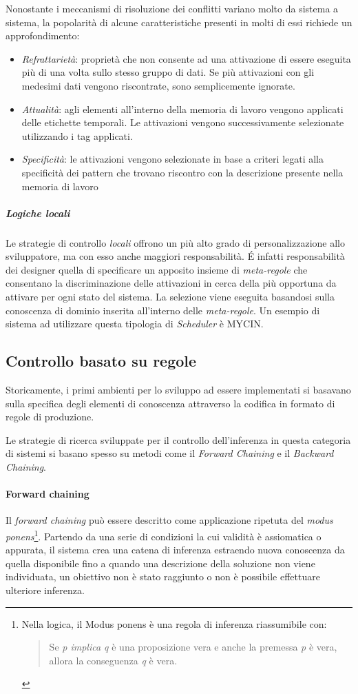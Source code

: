 Nonostante i meccanismi di risoluzione dei conflitti variano molto da sistema a sistema, la popolarità di alcune caratteristiche presenti in molti di essi richiede un approfondimento:

\begin{itemize}
	\item \emph{Refrattarietà}: proprietà che non consente ad una attivazione di essere eseguita più di una volta sullo stesso gruppo di dati. Se più attivazioni con gli medesimi dati vengono riscontrate, sono semplicemente ignorate.
	\item \emph{Attualità}: agli elementi all'interno della memoria di lavoro vengono applicati delle etichette temporali. Le attivazioni vengono successivamente selezionate utilizzando i tag applicati.
	\item \emph{Specificità}: le attivazioni vengono selezionate in base a criteri legati alla specificità dei pattern che trovano riscontro con la descrizione presente nella memoria di lavoro
\end{itemize}

\subparagraph{Logiche locali} Le strategie di controllo \emph{locali} offrono un più alto grado di personalizzazione allo sviluppatore, ma con esso anche maggiori responsabilità. \'E infatti responsabilità dei designer quella di specificare un apposito insieme di \emph{meta-regole} che consentano la discriminazione delle attivazioni in cerca della più opportuna da attivare per ogni stato del sistema. La selezione viene eseguita basandosi sulla conoscenza di dominio inserita all'interno delle \emph{meta-regole}. Un esempio di sistema ad utilizzare questa tipologia di \emph{Scheduler} è MYCIN.

\subsection{Controllo basato su regole}
Storicamente, i primi ambienti per lo sviluppo ad essere implementati si basavano sulla specifica degli elementi di conoscenza attraverso la codifica in formato di regole di produzione.

Le strategie di ricerca sviluppate per il controllo dell'inferenza in questa categoria di sistemi si basano spesso su metodi come il \emph{Forward Chaining} e il \emph{Backward Chaining}.

\paragraph{Forward chaining}
Il \emph{forward chaining} può essere descritto come applicazione ripetuta del \emph{modus ponens}\footnote{Nella logica, il Modus ponens è una regola di inferenza riassumibile con: \begin{quote}
Se \emph{p implica q} è una proposizione vera e anche la premessa \emph{p} è vera, allora la conseguenza \emph{q} è vera.
\end{quote}}. Partendo da una serie di condizioni la cui validità è assiomatica o appurata, il sistema crea una catena di inferenza estraendo nuova conoscenza da quella disponibile fino a quando una descrizione della soluzione non viene individuata, un obiettivo non è stato raggiunto o non è possibile effettuare ulteriore inferenza.

